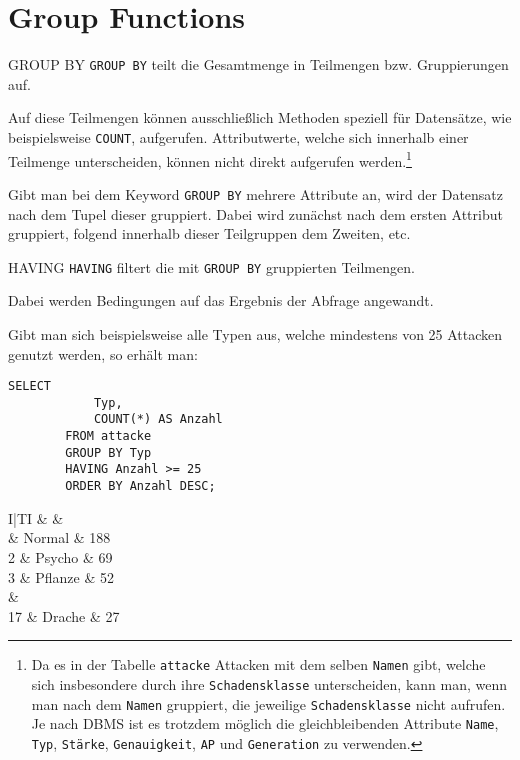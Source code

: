 \section{Group Functions}

\begin{sql}{GROUP BY}
    \texttt{GROUP BY} teilt die Gesamtmenge in Teilmengen bzw. Gruppierungen auf.
    
    Auf diese Teilmengen können ausschließlich Methoden speziell für Datensätze, wie beispielsweise \texttt{COUNT}, aufgerufen.
    Attributwerte, welche sich innerhalb einer Teilmenge unterscheiden, können nicht direkt aufgerufen werden.\footnote{
        Da es in der Tabelle \texttt{attacke} Attacken mit dem selben \texttt{Namen} gibt, welche sich insbesondere durch ihre \texttt{Schadensklasse} unterscheiden, kann man, wenn man nach dem \texttt{Namen} gruppiert, die jeweilige \texttt{Schadensklasse} nicht aufrufen.
        Je nach DBMS ist es trotzdem möglich die gleichbleibenden Attribute \texttt{Name}, \texttt{Typ}, \texttt{Stärke}, \texttt{Genauigkeit}, \texttt{AP} und \texttt{Generation} zu verwenden.
    }

    Gibt man bei dem Keyword \texttt{GROUP BY} mehrere Attribute an, wird der Datensatz nach dem Tupel dieser gruppiert.
    Dabei wird zunächst nach dem ersten Attribut gruppiert, folgend innerhalb dieser Teilgruppen dem Zweiten, etc. 
\end{sql}

\begin{sql}{HAVING}
    \texttt{HAVING} filtert die mit \texttt{GROUP BY} gruppierten Teilmengen.
    
    Dabei werden Bedingungen auf das Ergebnis der Abfrage angewandt.

    Gibt man sich beispielsweise alle Typen aus, welche mindestens von 25 Attacken genutzt werden, so erhält man:
    
    \begin{lstlisting}[language=mysql]
        SELECT
            Typ,
            COUNT(*) AS Anzahl
        FROM attacke
        GROUP BY Typ
        HAVING Anzahl >= 25
        ORDER BY Anzahl DESC;
    \end{lstlisting}

    \setcounter{rownum}{0}
    \begin{tabular}{I|TI}
        &  &  \\ & Normal & 188 \\
        2 & Psycho & 69 \\
        3 & Pflanze & 52 \\
         &  \\
        17 & Drache & 27 \\
    \end{tabular}
\end{sql}

